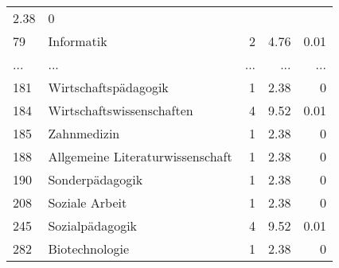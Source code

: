 \begin{longtable}{lXrrr}
          \num[round-mode=places,round-precision=2]{2.38} &
          \num[round-mode=places,round-precision=2]{0} \\
        79 & \multicolumn{1}{X}{Informatik} & %
          \num{2} &
          \num[round-mode=places,round-precision=2]{4.76} &
          \num[round-mode=places,round-precision=2]{0.01} \\
       ... & ... & ... & ... & ... \\
        181 & \multicolumn{1}{X}{Wirtschaftspädagogik} & %
          \num{1} &
          \num[round-mode=places,round-precision=2]{2.38} &
          \num[round-mode=places,round-precision=2]{0} \\

        184 & \multicolumn{1}{X}{Wirtschaftswissenschaften} & %
          \num{4} &
          \num[round-mode=places,round-precision=2]{9.52} &
          \num[round-mode=places,round-precision=2]{0.01} \\

        185 & \multicolumn{1}{X}{Zahnmedizin} & %
          \num{1} &
          \num[round-mode=places,round-precision=2]{2.38} &
          \num[round-mode=places,round-precision=2]{0} \\

        188 & \multicolumn{1}{X}{Allgemeine Literaturwissenschaft} & %
          \num{1} &
          \num[round-mode=places,round-precision=2]{2.38} &
          \num[round-mode=places,round-precision=2]{0} \\

        190 & \multicolumn{1}{X}{Sonderpädagogik} & %
          \num{1} &
          \num[round-mode=places,round-precision=2]{2.38} &
          \num[round-mode=places,round-precision=2]{0} \\

        208 & \multicolumn{1}{X}{Soziale Arbeit} & %
          \num{1} &
          \num[round-mode=places,round-precision=2]{2.38} &
          \num[round-mode=places,round-precision=2]{0} \\

        245 & \multicolumn{1}{X}{Sozialpädagogik} & %
          \num{4} &
          \num[round-mode=places,round-precision=2]{9.52} &
          \num[round-mode=places,round-precision=2]{0.01} \\

        282 & \multicolumn{1}{X}{Biotechnologie} & %
          \num{1} &
          \num[round-mode=places,round-precision=2]{2.38} &
          \num[round-mode=places,round-precision=2]{0} \\


\end{longtable}
